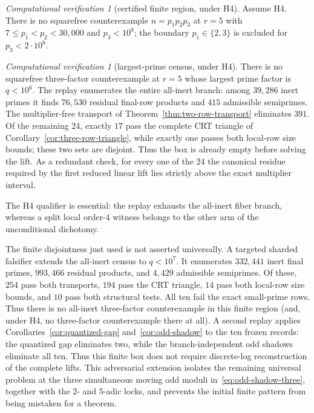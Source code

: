 \documentclass[11pt]{amsart}
\theoremstyle{definition}
\theoremstyle{remark}
\newtheorem{verification}[theorem]{Computational verification}
\begin{document}
\begin{verification}[certified finite region, under H4]\label{thm:threshold}
Assume H4. There is no squarefree counterexample $n = p_1p_2p_3$ at $r = 5$
with $7 \le p_1 < p_2 < 30{,}000$ and $p_3 < 10^9$; the boundary
$p_1 \in \{2,3\}$ is excluded for $p_3 < 2\cdot10^8$.
\end{verification}

\begin{verification}[largest-prime census, under H4]\label{ver:transport-million}
There is no squarefree three-factor counterexample at $r=5$ whose largest
prime factor is $q<10^6$.  The replay enumerates the entire all-inert branch:
among $39{,}286$ inert primes it finds $76{,}530$ residual final-row
products and $415$ admissible semiprimes.  The multiplier-free transport of
Theorem~\ref{thm:two-row-transport} eliminates $391$.  Of the remaining
$24$, exactly $17$ pass the complete CRT triangle of
Corollary~\ref{cor:three-row-triangle}, while exactly one passes both
local-row size bounds; these two sets are disjoint.  Thus the box is
already empty before solving the lift.  As a redundant check, for every
one of the $24$ the canonical residue required by the first reduced linear
lift lies strictly above the exact multiplier interval.
\end{verification}

The H4 qualifier is essential: the replay exhausts the all-inert fiber
branch, whereas a split local order-$4$ witness belongs to the other arm of
the unconditional dichotomy.

The finite disjointness just used is not asserted universally.  A targeted
sharded falsifier extends the all-inert census to \(q<10^7\).  It enumerates
\(332{,}441\) inert final primes, \(993{,}466\) residual products, and
\(4{,}429\) admissible semiprimes.  Of these, \(254\) pass both transports,
\(194\) pass the CRT triangle, \(14\) pass both local-row size bounds, and
\(10\) pass both structural tests.  All ten fail the exact small-prime
rows.  Thus there is no all-inert three-factor counterexample in this
finite region (and, under H4, no three-factor counterexample there at all).
A second replay applies Corollaries~\ref{cor:quantized-gap}
and~\ref{cor:odd-shadow} to the ten frozen records: the quantized gap
eliminates two, while the branch-independent odd shadows eliminate all ten.
Thus this finite box does not require discrete-log reconstruction of the
complete lifts.  This adversarial extension isolates the remaining
universal problem at the three simultaneous moving odd moduli
in~\eqref{eq:odd-shadow-three},
together with the \(2\)- and \(5\)-adic locks, and prevents the initial
finite pattern from being mistaken for a theorem.
\end{document}
